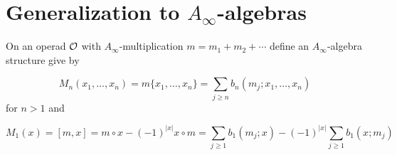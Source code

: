 \documentclass[twoside]{article}
\begin{document}
%
%
%
%
%
%
%
%
%
%
%

\section{Generalization to $A_\infty$-algebras}

On an operad ${\mathcal O}$ with $A_\infty$-multiplication $m=m_1+m_2+\cdots$ define an $A_\infty$-algebra structure give by

$$M_n(x_1,\dots, x_n)=m\{x_1,\dots, x_n\}=\sum_{j\geq n}b_n(m_j;x_1,\dots, x_n)$$
for $n>1$ and 

$$M_1(x)=[m,x]=m\circ x -(-1)^{|x|}x\circ m=\sum_{j\geq 1} b_1(m_j;x)-(-1)^{|x|}\sum_{j\geq 1}b_1(x;m_j)$$
\end{document}
